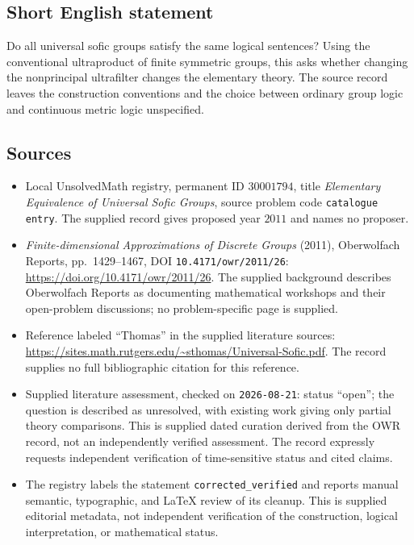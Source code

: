 \documentclass[11pt]{article}
\begin{document}
\subsection{Short English statement}
Do all universal sofic groups satisfy the same logical sentences? Using the conventional ultraproduct of finite symmetric groups, this asks whether changing the nonprincipal ultrafilter changes the elementary theory. The source record leaves the construction conventions and the choice between ordinary group logic and continuous metric logic unspecified.
\subsection{Sources}
\begin{itemize}
\item Local UnsolvedMath registry, permanent ID \(30001794\), title \emph{Elementary Equivalence of Universal Sofic Groups}, source problem code \texttt{catalogue entry}. The supplied record gives proposed year \(2011\) and names no proposer.
\item \emph{Finite-dimensional Approximations of Discrete Groups} (2011), Oberwolfach Reports, pp.\ 1429--1467, DOI \texttt{10.4171/owr/2011/26}: \url{https://doi.org/10.4171/owr/2011/26}. The supplied background describes Oberwolfach Reports as documenting mathematical workshops and their open-problem discussions; no problem-specific page is supplied.
\item Reference labeled ``Thomas'' in the supplied literature sources: \url{https://sites.math.rutgers.edu/~sthomas/Universal-Sofic.pdf}. The record supplies no full bibliographic citation for this reference.
\item Supplied literature assessment, checked on \texttt{2026-08-21}: status ``open''; the question is described as unresolved, with existing work giving only partial theory comparisons. This is supplied dated curation derived from the OWR record, not an independently verified assessment. The record expressly requests independent verification of time-sensitive status and cited claims.
\item The registry labels the statement \texttt{corrected\_verified} and reports manual semantic, typographic, and LaTeX review of its cleanup. This is supplied editorial metadata, not independent verification of the construction, logical interpretation, or mathematical status.
\end{itemize}
\end{document}
